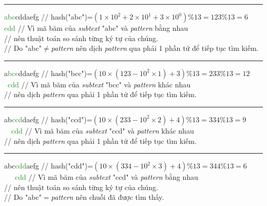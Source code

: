 \documentclass[a4paper,11pt]{article}
\begin{document}
\begin{enumerate}
			\vspace*{4mm}
			\hrule
			\textcolor{ForestGreen}{abc}cddaefg \hspace*{0.6cm} // hash("abc")=$(1\times10^2+2\times10^1+3\times10^0) \% 13=123 \% 13=6$\\
			\textcolor{ForestGreen}{cdd} \hspace*{1.8cm} // Vì mã băm của \textit{subtext} "abc" và \textit{pattern} bằng nhau \\
		\hspace*{2.5cm} // nên thuật toán so sánh từng ký tự của chúng.\\
		\hspace*{2.5cm} // Do "abc"$\neq$\textit{pattern} nên dịch \textit{pattern} qua phải 1 phần tử để tiếp tục tìm kiếm.\\

			\vspace*{2mm}
			\hrule
			a\textcolor{ForestGreen}{bcc}ddaefg \hspace*{0.6cm} // hash("bcc")=$(10\times(123-10^2\times1)+3)\%13=233\%13=12$\\
			\textcolor{white}{a}\textcolor{ForestGreen}{cdd} \hspace*{1.6cm} // Vì mã băm của \textit{subtext} "bcc" và \textit{pattern} khác nhau \\
		\hspace*{2.5cm} // nên dịch \textit{pattern} qua phải 1 phần tử để tiếp tục tìm kiếm.\\

			\vspace*{2mm}
			\hrule
			ab\textcolor{ForestGreen}{ccd}daefg \hspace*{0.6cm} // hash("ccd")=$(10\times(233-10^2\times2)+4)\%13=334\%13=9$\\
			\textcolor{white}{aa}\textcolor{ForestGreen}{cdd} \hspace*{1.4cm} // Vì mã băm của \textit{subtext} "ccd" và \textit{pattern} khác nhau \\
		\hspace*{2.5cm} // nên dịch \textit{pattern} qua phải 1 phần tử để tiếp tục tìm kiếm.\\

			\vspace*{2mm}
			\hrule
			abc\textcolor{ForestGreen}{cdd}aefg \hspace*{0.6cm} // hash("cdd")=$(10\times(334-10^2\times3)+4)\%13=344\%13=6$\\
			\textcolor{white}{aaa}\textcolor{ForestGreen}{cdd} \hspace*{1.2cm} // Vì mã băm của \textit{subtext} "ccd" và \textit{pattern} bằng nhau \\
		\hspace*{2.5cm} // nên thuật toán so sánh từng ký tự của chúng.\\
		\hspace*{2.5cm} // Do "abc"$=$\textit{pattern} nên chuỗi đã được tìm thấy.\\


\end{enumerate}
\end{document}
